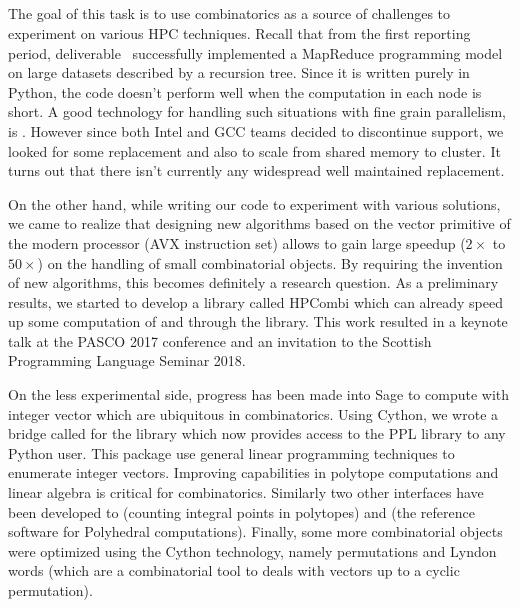   \subparagraph{}

  The goal of this task is to use combinatorics as a source of challenges to
  experiment on various HPC techniques. Recall that from the first reporting
  period, deliverable~ successfully
  implemented a MapReduce programming model on large datasets described by a
  recursion tree. Since it is written purely in Python, the code doesn't
  perform well when the computation in each node is short. A good technology
  for handling such situations with fine grain parallelism, is
  . However since both Intel and GCC teams decided to
  discontinue  support, we looked for some replacement and
  also to scale from shared memory to cluster. It turns out that there isn't
  currently any widespread well maintained replacement.

  On the other hand, while writing our code to experiment with various
  solutions, we came to realize that designing new algorithms based on the
  vector primitive of the modern processor (AVX instruction set) allows to
  gain large speedup ($2\times$ to $50\times$) on the handling of small
  combinatorial objects. By requiring the invention of new algorithms, this
  becomes definitely a research question. As a preliminary results, we started
  to develop a library called HPCombi which can already speed up some
  computation of  and  through the
   library. This work resulted in a keynote talk at the
  PASCO 2017 conference and an invitation to the Scottish Programming Language
  Seminar 2018.

  On the less experimental side, progress has been made into Sage to compute
  with integer vector which are ubiquitous in combinatorics. Using Cython, we
  wrote a bridge called  for the  library which
  now provides access to the PPL library to any Python user. This package use
  general linear programming techniques to enumerate integer vectors.
  Improving \Sage capabilities in polytope computations and linear algebra is
  critical for combinatorics. Similarly two other interfaces have been developed
  to  (counting integral points in polytopes) and
   (the reference software for Polyhedral computations).
  Finally, some more combinatorial objects were optimized using the Cython
  technology, namely permutations and Lyndon words (which are a combinatorial
  tool to deals with vectors up to a cyclic permutation).


